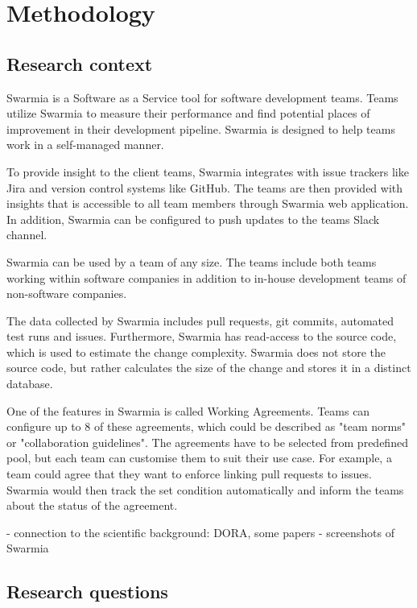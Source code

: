 
\chapter{Methodology}

\section{Research context}

Swarmia is a Software as a Service tool for software development teams. Teams utilize Swarmia to measure their performance and find potential places of improvement in their development pipeline. Swarmia is designed to help teams work in a self-managed manner. 

To provide insight to the client teams, Swarmia integrates with issue trackers like Jira and version control systems like GitHub. The teams are then provided with insights that is accessible to all team members through Swarmia web application. In addition, Swarmia can be configured to push updates to the teams Slack channel. 

Swarmia can be used by a team of any size. The teams include both teams working within software companies in addition to in-house development teams of non-software companies. 

The data collected by Swarmia includes pull requests, git commits, automated test runs and issues. Furthermore, Swarmia has read-access to the source code, which is used to estimate the change complexity. Swarmia does not store the source code, but rather calculates the size of the change and stores it in a distinct database. 

One of the features in Swarmia is called Working Agreements. Teams can configure up to 8 of these agreements, which could be described as "team norms" or "collaboration guidelines". The agreements have to be selected from predefined pool, but each team can customise them to suit their use case. For example, a team could agree that they want to enforce linking pull requests to issues. Swarmia would then track the set condition automatically and inform the teams about the status of the agreement. 

- connection to the scientific background: DORA, some papers
- screenshots of Swarmia

\section{Research questions}

